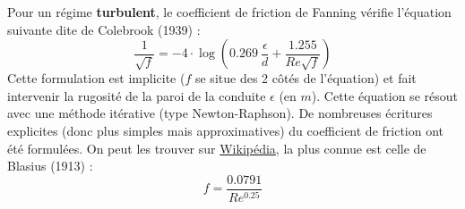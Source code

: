 Pour un régime \textbf{turbulent}, le coefficient de friction de Fanning vérifie l'équation suivante dite de Colebrook (1939) :
%
\begin{equation}
\frac{1}{\sqrt{f}} = -4\cdot\log\left(0.269~\frac{\epsilon}{d} + \frac{1.255}{Re\sqrt{f}}\right)
\end{equation}
%
Cette formulation est implicite ($f$ se situe des 2 côtés de l'équation) et fait intervenir la rugosité de la paroi de la conduite $\epsilon$ (en $m$). Cette équation se résout avec une méthode itérative (type Newton-Raphson). De nombreuses écritures explicites (donc plus simples mais approximatives) du coefficient de friction ont été formulées. On peut les trouver sur \href{https://en.wikipedia.org/wiki/Darcy_friction_factor_formulae}{Wikipédia}, la plus connue est celle de Blasius (1913) :
%
\begin{equation}
f = \frac{0.0791}{Re^{0.25}}
\end{equation}
